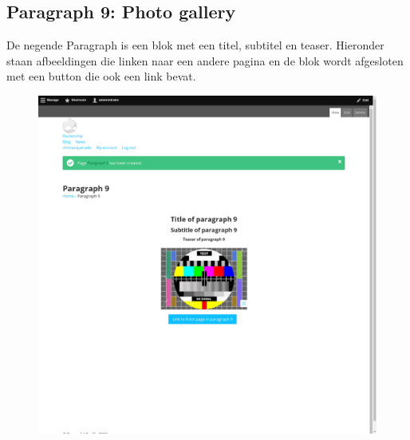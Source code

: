 \subsection{Paragraph 9: Photo gallery}
De negende Paragraph is een blok met een titel, subtitel en teaser. Hieronder staan afbeeldingen die linken naar een andere pagina en de blok wordt afgesloten met een button die ook een link bevat.
\begin{figure}[h]
\includegraphics[width=1\textwidth]{img/p009.png}
\end{figure}

\clearpage
